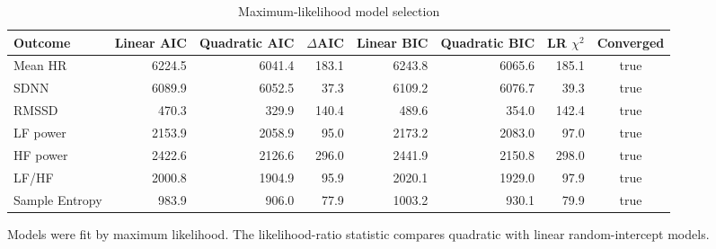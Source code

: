 \begin{table}[htbp]
\centering
\begin{threeparttable}
\begin{tabular}{lrrrrrrc}
\toprule
Outcome & Linear AIC & Quadratic AIC & $\Delta$AIC & Linear BIC & Quadratic BIC & LR $\chi^2$ & Converged \\
\midrule
Mean HR & 6224.5 & 6041.4 & 183.1 & 6243.8 & 6065.6 & 185.1 & true \\
SDNN & 6089.9 & 6052.5 & 37.3 & 6109.2 & 6076.7 & 39.3 & true \\
RMSSD & 470.3 & 329.9 & 140.4 & 489.6 & 354.0 & 142.4 & true \\
LF power & 2153.9 & 2058.9 & 95.0 & 2173.2 & 2083.0 & 97.0 & true \\
HF power & 2422.6 & 2126.6 & 296.0 & 2441.9 & 2150.8 & 298.0 & true \\
LF/HF & 2000.8 & 1904.9 & 95.9 & 2020.1 & 1929.0 & 97.9 & true \\
Sample Entropy & 983.9 & 906.0 & 77.9 & 1003.2 & 930.1 & 79.9 & true \\
\bottomrule
\end{tabular}\begin{tablenotes}\footnotesize\item Models were fit by maximum likelihood. The likelihood-ratio statistic compares quadratic with linear random-intercept models.\end{tablenotes}
\end{threeparttable}
\caption{Maximum-likelihood model selection}
\label{tab:s2-model-selection}
\end{table}
